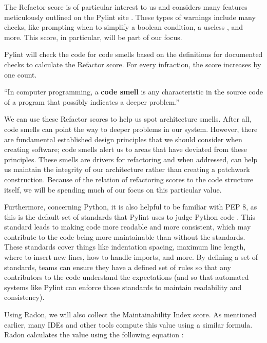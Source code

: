 The Refactor score is of particular interest to us and considers many features meticulously outlined on the Pylint site \cite{pylint:refactor}. These types of warnings include many checks, like prompting when to simplify a boolean condition, a useless , and more. This score, in particular, will be part of our focus.

Pylint will check the code for code smells based on the definitions for documented checks to calculate the Refactor score. For every infraction, the score increases by one count. 


\vspace{0.25cm}
\begin{displayquote}
  ``In computer programming, a \textbf{code smell} is any characteristic in the source code of a program that possibly indicates a deeper problem.'' \cite{wiki:code-smells}
\end{displayquote}
\vspace{0.25cm}

We can use these Refactor scores to help us spot architecture smells. After all, code smells can point the way to deeper problems in our system. However, there are fundamental established design principles that we should consider when creating software; code smells alert us to areas that have deviated from these principles. These smells are drivers for refactoring and when addressed, can help us maintain the integrity of our architecture rather than creating a patchwork construction. Because of the relation of refactoring scores to the code structure itself, we will be spending much of our focus on this particular value.

Furthermore, concerning Python, it is also helpful to be familiar with PEP 8, as this is the default set of standards that Pylint uses to judge Python code \cite{pylint:pep8}. This standard leads to making code more readable and more consistent, which may contribute to the code being more maintainable than without the standards. These standards cover things like indentation spacing, maximum line length, where to insert new lines, how to handle imports, and more. By defining a set of standards, teams can ensure they have a defined set of rules so that any contributors to the code understand the expectations (and so that automated systems like Pylint can enforce those standards to maintain readability and consistency).

Using Radon, we will also collect the Maintainability Index score. As mentioned earlier, many IDEs and other tools compute this value using a similar formula. Radon calculates the value using the following equation \cite{radon:docs}:

